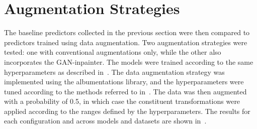 \section{Augmentation Strategies}\label{augmentations}
The baseline predictors collected in the previous section were then compared to predictors trained using data augmentation. Two augmentation strategies were tested: one with conventional augmentations only, while the other also incorporates the GAN-inpainter. The models were trained according to the same hyperparameters as described in~. The data augmentation strategy was implemented using the albumentations library, and the hyperparameters were tuned according to the methods referred to in~. The data was then augmented with a probability of 0.5, in which case the constituent transformations were applied according to the ranges defined by the hyperparameters. The results for each configuration and across models and datasets are shown in~.

